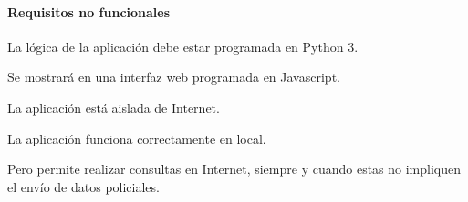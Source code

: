   \paragraph{Requisitos no funcionales}
  
  \begin{nonfunctional}
    \item La lógica de la aplicación debe estar programada en Python 3.
    \item Se mostrará en una interfaz web programada en Javascript.
    
    \item La aplicación está aislada de Internet.
    \begin{nonfunctional}
      \item La aplicación funciona correctamente en local.
      \item Pero permite realizar consultas en Internet, siempre y cuando estas no impliquen el envío de datos policiales.
    \end{nonfunctional}
  \end{nonfunctional}